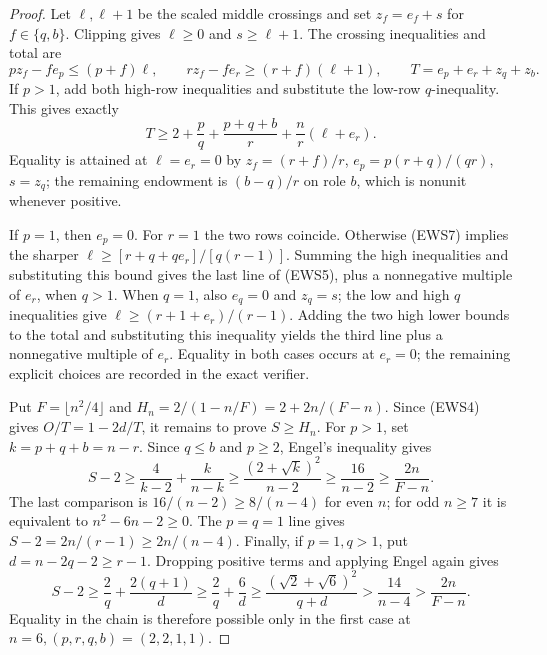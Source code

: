 \documentclass[11pt]{article}
\begin{document}
\begin{proof}
Let $\ell,\ell+1$ be the scaled middle crossings and set
$z_f=e_f+s$ for $f\in\{q,b\}$.  Clipping gives $\ell\ge0$ and
$s\ge\ell+1$.  The crossing inequalities and total are
\[
 pz_f-fe_p\le(p+f)\ell,\qquad
 rz_f-fe_r\ge(r+f)(\ell+1),\qquad
 T=e_p+e_r+z_q+z_b.                                    \tag{EWS7}
\]
If $p>1$, add both high-row inequalities and substitute the low-row
$q$-inequality.  This gives exactly
\[
 T\ge2+\frac pq+\frac{p+q+b}{r}
        +\frac{n}{r}(\ell+e_r).                         \tag{EWS8}
\]
Equality is attained at $\ell=e_r=0$ by
$z_f=(r+f)/r$, $e_p=p(r+q)/(qr)$, $s=z_q$; the remaining
endowment is $(b-q)/r$ on role $b$, which is nonunit whenever positive.

If $p=1$, then $e_p=0$.  For $r=1$ the two rows coincide.  Otherwise
(EWS7) implies the sharper
$\ell\ge[r+q+qe_r]/[q(r-1)]$.  Summing the high inequalities and substituting
this bound gives the last line of (EWS5), plus a nonnegative multiple of
$e_r$, when $q>1$.
When $q=1$, also $e_q=0$ and $z_q=s$; the low and high $q$ inequalities give
$\ell\ge(r+1+e_r)/(r-1)$.  Adding the two high lower bounds to the total and
substituting this inequality yields the third line plus a nonnegative
multiple of $e_r$.  Equality in both cases occurs at $e_r=0$; the remaining
explicit choices are recorded in the exact verifier.

Put $F=\lfloor n^2/4\rfloor$ and
$H_n=2/(1-n/F)=2+2n/(F-n)$.  Since (EWS4) gives
$O/T=1-2d/T$, it remains to prove $S\ge H_n$.  For $p>1$, set
$k=p+q+b=n-r$.  Since $q\le b$ and $p\ge2$, Engel's inequality gives
\[
 S-2\ge\frac4{k-2}+\frac{k}{n-k}
 \ge\frac{(2+\sqrt{k})^2}{n-2}\ge\frac{16}{n-2}
 \ge\frac{2n}{F-n}.                                    \tag{EWS9}
\]
The last comparison is $16/(n-2)\ge8/(n-4)$ for even $n$; for odd
$n\ge7$ it is equivalent to $n^2-6n-2\ge0$.  The $p=q=1$ line gives
$S-2=2n/(r-1)\ge2n/(n-4)$.  Finally, if $p=1,q>1$, put
$d=n-2q-2\ge r-1$.  Dropping positive terms and applying Engel again gives
\[
 S-2\ge\frac2q+\frac{2(q+1)}d
 \ge\frac2q+\frac6d
 \ge\frac{(\sqrt2+\sqrt6)^2}{q+d}
 >\frac{14}{n-4}>\frac{2n}{F-n}.                       \tag{EWS10}
\]
Equality in the chain is therefore possible only in the first case at
$n=6,(p,r,q,b)=(2,2,1,1)$.
\end{proof}
\end{document}
